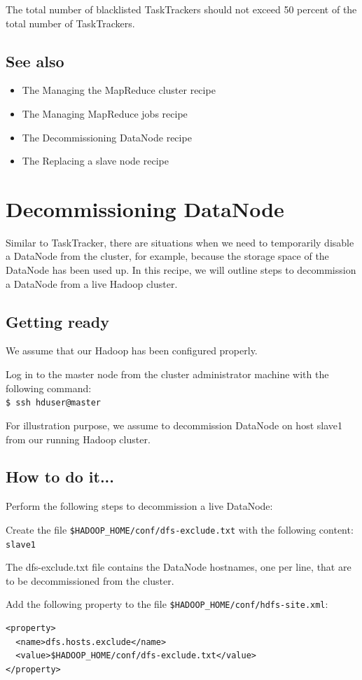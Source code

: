 The total number of blacklisted TaskTrackers should not exceed 50 percent of the total number of TaskTrackers.
\subsection*{See also}
\begin{itemize}
  \item The Managing the MapReduce cluster recipe
  \item The Managing MapReduce jobs recipe
  \item The Decommissioning DataNode recipe
  \item The Replacing a slave node recipe
\end{itemize}

\section{Decommissioning DataNode}
Similar to TaskTracker, there are situations when we need to temporarily disable a DataNode from the cluster, for example, because the storage space of the DataNode has been used up. In this recipe, we will outline steps to decommission a DataNode from a live Hadoop cluster.
\subsection*{Getting ready}
We assume that our Hadoop has been configured properly.

Log in to the master node from the cluster administrator machine with the following command: \\
\verb|$ ssh hduser@master|

For illustration purpose, we assume to decommission DataNode on host slave1 from our running Hadoop cluster.
\subsection*{How to do it...}
Perform the following steps to decommission a live DataNode:

Create the file \verb|$HADOOP_HOME/conf/dfs-exclude.txt| with the following content:\\
\verb|slave1|

The dfs-exclude.txt file contains the DataNode hostnames, one per line, that are to be decommissioned from the cluster.

Add the following property to the file \verb|$HADOOP_HOME/conf/hdfs-site.xml|:
\begin{verbatim}
<property>
  <name>dfs.hosts.exclude</name>
  <value>$HADOOP_HOME/conf/dfs-exclude.txt</value>
</property>
\end{verbatim}

